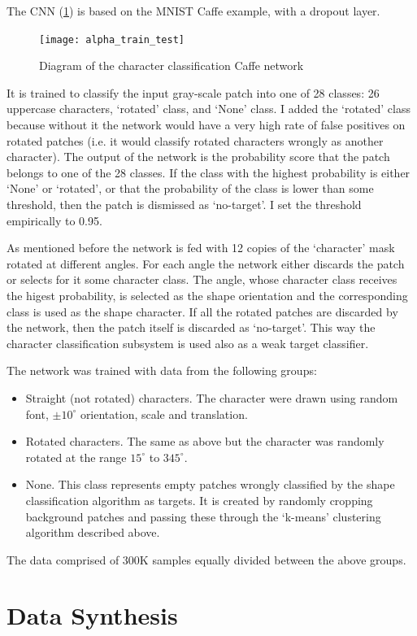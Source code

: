 \documentclass{article} %
\begin{document}
The CNN (\cref{fig:alpha_NN}) is based on the MNIST Caffe example, with a dropout layer.
\begin{figure}[h]
	\centering
	\texttt{[image: alpha\_train\_test]}
	\caption{Diagram of the character classification Caffe network}
	\label{fig:alpha_NN}
\end{figure}
It is trained to classify the input gray-scale patch into one of 28 classes: 26 uppercase characters,
`rotated' class, and `None' class. I added the `rotated' class because without it the
network would have a very high rate of false positives on rotated patches (i.e. it
would classify rotated characters wrongly as another character). The output of the network
is the probability score that the patch belongs to one of the 28 classes. If the class
with the highest probability is either `None' or `rotated', or that the probability of
the class is lower than some threshold, then the patch is dismissed as `no-target'.
I set the threshold empirically to 0.95.

As mentioned before the network is fed with 12 copies of the `character' mask rotated at
different angles. For each angle the network either discards the patch or selects for it
some character class.
The angle, whose character class receives the higest probability, is selected as the shape
orientation and the corresponding class is used as the shape character. If all the rotated
patches are discarded by the network, then the patch itself is discarded as `no-target'.
This way the character classification subsystem is used also as a weak target classifier. 

The network was trained with data from the following groups:
\begin{itemize}
	\item Straight (not rotated) characters. The character were drawn using random
	font, $\pm10^\circ$ orientation, scale and translation.
	\item Rotated characters. The same as above but the character was randomly rotated
	at the range $15^\circ$ to $345^\circ$.
	\item None. This class represents empty patches wrongly classified by the
	shape classification algorithm as targets. It is created by randomly cropping background
	patches and passing these through the `k-means' clustering algorithm described above.
\end{itemize}
The data comprised of $300$K samples equally divided between the above groups.

\section{Data Synthesis}
\label{sec:data_synthesis}
\end{document}
